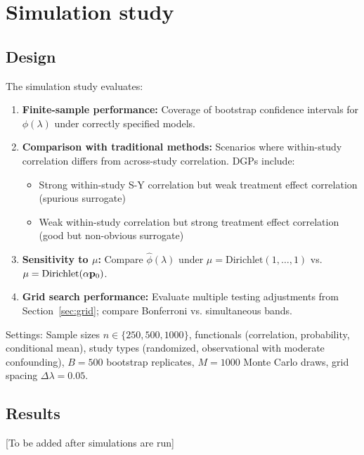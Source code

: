 \documentclass{article}
\newcommand{\PP}{\mathbb{P}}
\begin{document}
\section{Simulation study}

\subsection{Design}

The simulation study evaluates:
\begin{enumerate}
    \item \textbf{Finite-sample performance:} Coverage of bootstrap confidence
          intervals for $\phi(\lambda)$ under correctly specified models.

    \item \textbf{Comparison with traditional methods:} Scenarios where
          within-study correlation differs from across-study correlation. DGPs include:
          \begin{itemize}
              \item Strong within-study S-Y correlation but weak treatment effect
                    correlation (spurious surrogate)
              \item Weak within-study correlation but strong treatment effect
                    correlation (good but non-obvious surrogate)
          \end{itemize}

    \item \textbf{Sensitivity to $\mu$:} Compare $\hat{\phi}(\lambda)$ under
          $\mu = \text{Dirichlet}(1,\ldots,1)$ vs. $\mu = \text{Dirichlet}(\alpha\mathbf{p}_0)$.

    \item \textbf{Grid search performance:} Evaluate multiple testing adjustments
          from Section~\ref{sec:grid}; compare Bonferroni vs. simultaneous bands.
\end{enumerate}

Settings: Sample sizes $n \in \{250, 500, 1000\}$, functionals (correlation,
probability, conditional mean), study types (randomized, observational with
moderate confounding), $B = 500$ bootstrap replicates, $M = 1000$ Monte Carlo draws,
grid spacing $\Delta\lambda = 0.05$.

\subsection{Results}

[To be added after simulations are run]
\end{document}
